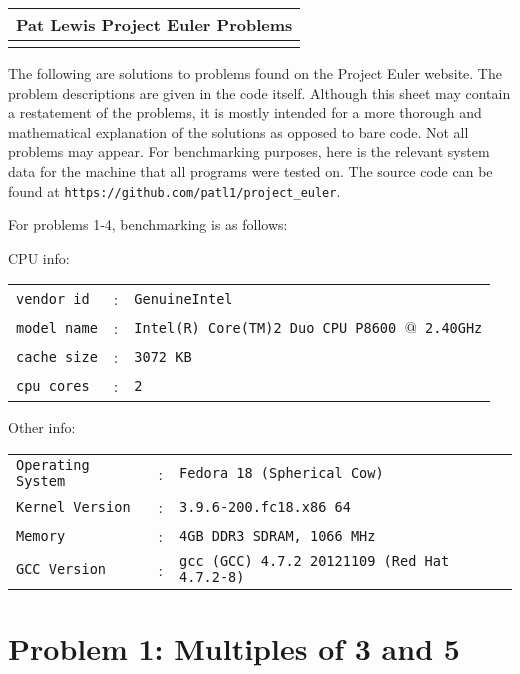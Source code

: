 \documentclass{article}
\begin{document}
\begin{table}
\setlength{\extrarowheight}{4pt}
\begin{tabularx}{\textwidth}{ X }
\hline
{\textbf{Pat Lewis}} \hfill {\textbf{Project Euler Problems}}\\
\hline\\
\end{tabularx}
\end{table}

The following are solutions to problems found on the Project Euler website. The problem 
descriptions are given in the code itself. Although this sheet may contain a restatement of 
the problems, it is mostly intended for a more thorough and mathematical explanation of the 
solutions as opposed to bare code. Not all problems may appear. For benchmarking purposes, 
here is the relevant system data for the machine that all programs were tested on. The source 
code can be found at \texttt{https://github.com/patl1/project\_euler}.

For problems 1-4, benchmarking is as follows:

\medskip

\noindent CPU info:

\begin{tabular}{lcl}
\texttt{vendor id} 	& : & \texttt{GenuineIntel}									\\
\texttt{model name}	& : & \texttt{Intel(R) Core(TM)2 Duo CPU P8600 $@$ 2.40GHz}	\\
\texttt{cache size}	& : & \texttt{3072 KB}										\\
\texttt{cpu cores}	& : & \texttt{2}
\end{tabular}

\noindent Other info:

\begin{tabular}{lcl}
\texttt{Operating System}	& : & \texttt{Fedora 18 (Spherical Cow)}					\\
\texttt{Kernel Version}		& : & \texttt{3.9.6-200.fc18.x86 64}						\\
\texttt{Memory}				& : & \texttt{4GB DDR3 SDRAM, 1066 MHz}						\\
\texttt{GCC Version}			& : & \texttt{gcc (GCC) 4.7.2 20121109 (Red Hat 4.7.2-8)}	\\
\end{tabular}

\section{Problem 1: Multiples of 3 and 5}
\end{document}
